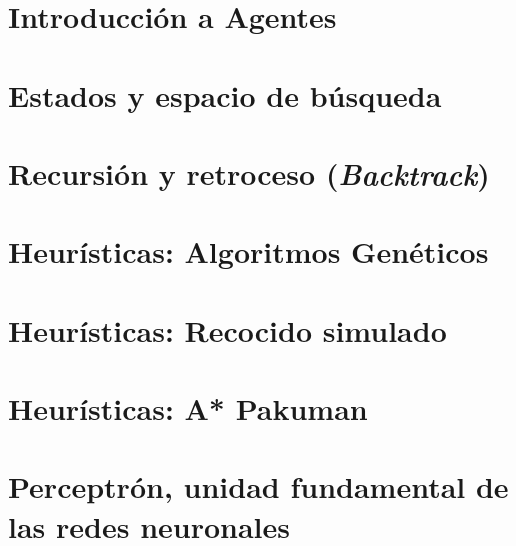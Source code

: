 \documentclass[12pt,openany]{book}
\begin{document}
\chapter{Introducción a Agentes}





\chapter{Estados y espacio de búsqueda}






\chapter[Retroceso]{Recursión y retroceso (\textit{Backtrack})}





\chapter{Heurísticas: Algoritmos Genéticos}





\chapter{Heurísticas: Recocido simulado}






\chapter{Heurísticas: A* Pakuman}






\chapter[Perceptrón]{Perceptrón, unidad fundamental de las redes neuronales}
\end{document}
